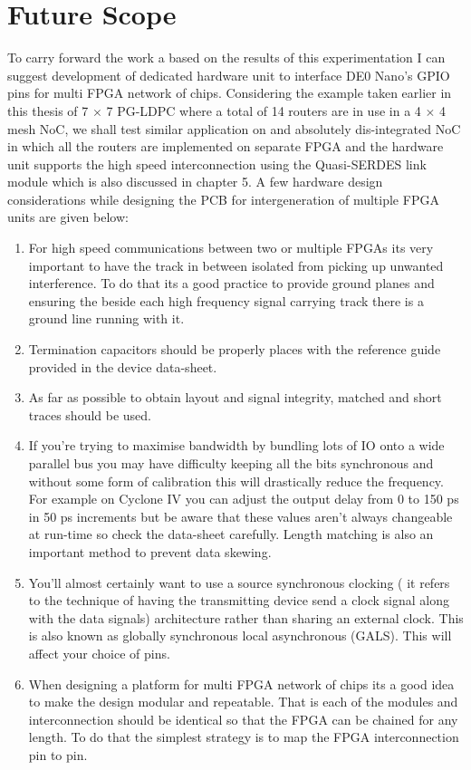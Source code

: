 \section{Future Scope}
To carry forward the work a based on the results of this experimentation I can suggest development of dedicated hardware unit to interface DE0 Nano's GPIO pins for multi FPGA network of chips. Considering the example taken earlier in this thesis of 7 $\times$ 7 PG-LDPC where a total of 14 routers are in use in a 4 $\times$ 4 mesh NoC, we shall test similar application on and absolutely dis-integrated NoC in which all the routers are implemented on separate FPGA and the hardware unit supports the high speed interconnection using the Quasi-SERDES link module which is also discussed in chapter 5. A few hardware design considerations while designing the PCB for intergeneration of multiple FPGA units are given below:
\begin{enumerate}
	\item{For high speed communications between two or multiple FPGAs its very important to have the track in between isolated from picking up unwanted interference. To do that its a good practice to provide ground planes and ensuring the beside each high frequency signal carrying track there is a ground line running with it.}
	\item{Termination capacitors should be properly places with the reference guide provided in the device data-sheet.}
	\item{As far as possible to obtain layout and signal integrity, matched and short traces should be used.}
	\item{If you're trying to maximise bandwidth by bundling lots of IO onto a wide parallel bus you may have difficulty keeping all the bits synchronous and without some form of calibration this will drastically reduce the frequency. For example on Cyclone IV you can adjust the output delay from 0 to 150 ps in 50 ps increments but be aware that these values aren't always changeable at run-time so check the data-sheet carefully. Length matching is also an important method to prevent data skewing.}
	\item{You'll almost certainly want to use a source synchronous clocking ( it refers to the technique of having the transmitting device send a clock signal along with the data signals) architecture rather than sharing an external clock. This is also known as globally synchronous local asynchronous (GALS). This will affect your choice of pins.}
	\item{When designing a platform for multi FPGA network of chips its a good idea to make the design modular and repeatable. That is each of the modules and interconnection should be identical so that the FPGA can be chained for any length. To do that the simplest strategy is to map the FPGA interconnection pin to pin. }
\end{enumerate}

